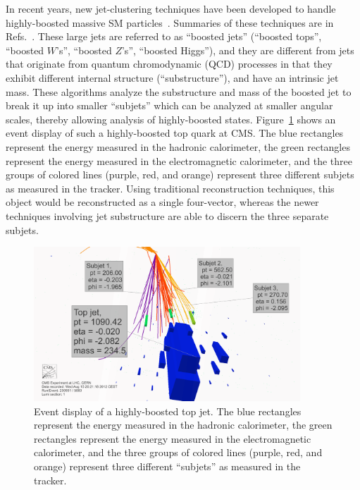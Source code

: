 \documentclass[12pt]{proposalnsf}
\begin{document}
In recent years, new jet-clustering techniques have been developed to handle
highly-boosted massive SM
particles~\cite{Seymour:1993mx,boostedhiggs,catop_theory,catop_cms,jetpruning1,jetpruning2,nsub,heptoptagger,trimming}.
Summaries of these techniques are in Refs.~\cite{boost2010,boost2011}.
These
large jets are referred to as 
``boosted jets'' (``boosted tops'', ``boosted $W$'s'', ``boosted
$Z$'s'', ``boosted Higgs''), and they are
different from jets that originate from quantum chromodynamic (QCD)
processes in that they exhibit different internal structure
(``substructure''), and have an intrinsic jet mass. 
These algorithms
analyze the substructure and mass
of the boosted jet to break it up into smaller ``subjets'' which can be
analyzed at smaller angular scales, thereby allowing analysis
of highly-boosted states. Figure~\ref{boostedtop_eventdisplay}
shows an event display of such a highly-boosted top quark at CMS. 
The blue rectangles represent the
energy measured in the hadronic calorimeter, the green
rectangles represent the energy measured in the electromagnetic
calorimeter, and the three groups of colored lines (purple, red,
and orange) represent three different subjets as measured in
the tracker. Using traditional reconstruction techniques, this object
would be reconstructed as a single four-vector, whereas the newer
techniques involving jet substructure are able to discern the three
separate subjets. 


\begin{figure}[h!]
    \centering
    \includegraphics[width=100mm]{topjet_rechits_white}
    \caption{\label{boostedtop_eventdisplay} Event display of a
      highly-boosted top jet. The blue rectangles represent the
      energy measured in the hadronic calorimeter, the green
      rectangles represent the energy measured in the electromagnetic
      calorimeter, and the three groups of colored lines (purple, red,
      and orange) represent three different ``subjets'' as measured in
      the tracker.}
\end{figure}
\end{document}
